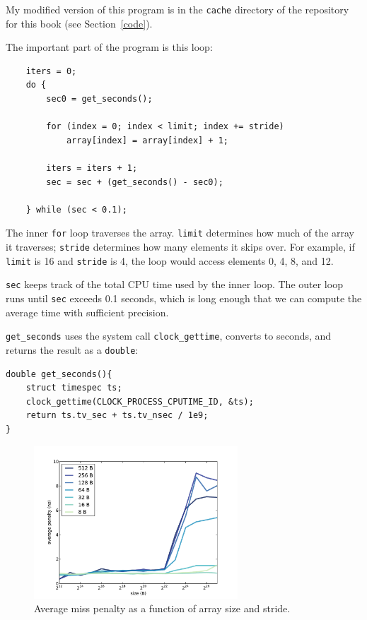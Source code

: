 \documentclass[12pt]{book}
\begin{document}
{My modified version of this program is in the {\tt cache} directory
of the repository for this
book (see Section~\ref{code}).

The important part of the program is this loop:

\begin{verbatim}
    iters = 0;
    do {
        sec0 = get_seconds();

        for (index = 0; index < limit; index += stride) 
            array[index] = array[index] + 1;
        
        iters = iters + 1; 
        sec = sec + (get_seconds() - sec0);
        
    } while (sec < 0.1);
\end{verbatim}

The inner {\tt for} loop traverses the array.  {\tt limit}
determines how much of the array it traverses; {\tt stride}
determines how many elements it skips over.  For example, if
{\tt limit} is 16 and {\tt stride} is 4, the loop would access
elements 0, 4, 8, and 12.

{\tt sec} keeps track of the total CPU time used by the inner loop.
The outer loop runs until {\tt sec} exceeds 0.1 seconds, which is
long enough that we can compute the average time with sufficient
precision.

\verb"get_seconds" uses the system call \verb"clock_gettime",
converts to seconds, and returns the result as a {\tt double}:

\begin{verbatim}
double get_seconds(){
    struct timespec ts;
    clock_gettime(CLOCK_PROCESS_CPUTIME_ID, &ts);
    return ts.tv_sec + ts.tv_nsec / 1e9;
}
\end{verbatim}

\begin{figure}
\centerline{\includegraphics[width=3in]{figs/cache_data.pdf}}
\caption{Average miss penalty as a function of array size and stride.}
\label{cachedata}
\end{figure}

}
\end{document}
